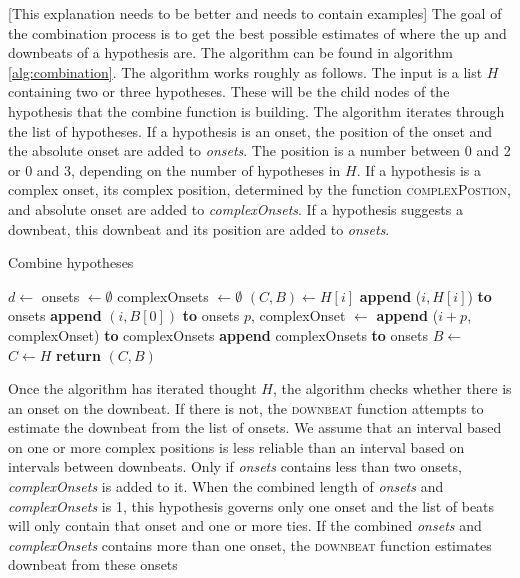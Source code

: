 [This explanation needs to be better and needs to contain examples]
The goal of the combination process is to get the best possible estimates of where the up and downbeats of a hypothesis are. The algorithm can be found in algorithm \ref{alg:combination}. The algorithm works roughly as follows. The input is a list $H$ containing two or three hypotheses. These will be the child nodes of the hypothesis that the combine function is building. The algorithm iterates through the list of hypotheses. If a hypothesis is an onset, the position of the onset and the absolute onset are added to \textit{onsets}. The position is a number between 0 and 2 or 0 and 3, depending on the number of hypotheses in $H$. If a hypothesis is a complex onset, its complex position, determined by the function \textsc{complexPostion}, and absolute onset are added to \textit{complexOnsets}. If a hypothesis suggests a downbeat, this downbeat and its position are added to \textit{onsets}.

\begin{algorithm}
\caption{Combine hypotheses}
\label{alg:combination}
\begin{algorithmic}
	\State $d \leftarrow$ 
	\State onsets $\leftarrow \emptyset$
	\State complexOnsets $\leftarrow \emptyset$
		\State $(C, B) \leftarrow H[i]$
			\State \textbf{append} ($i, H[i]$) \textbf{to} onsets
		\Else
				\State \textbf{append} $(i, B[0])$ \textbf{to} onsets
			\Else
				\State $p$, complexOnset $\leftarrow$ 
				\State \textbf{append} ($i + p$, complexOnset) \textbf{to} complexOnsets
			\EndIf
		\EndIf
	\EndFor
		\State \textbf{append} complexOnsets \textbf{to} onsets
	\EndIf
	\State $B \leftarrow$ 
	\State $C \leftarrow H$
	\State \textbf{return} $(C, B)$
\EndFunction
\end{algorithmic}
\end{algorithm}

Once the algorithm has iterated thought $H$, the algorithm checks whether there is an onset on the downbeat. If there is not, the \textsc{downbeat} function attempts to estimate the downbeat from the list of onsets. We assume that an interval based on one or more complex positions is less reliable than an interval based on intervals between downbeats. Only if \textit{onsets} contains less than two onsets, \textit{complexOnsets} is added to it. When the combined length of \textit{onsets} and \textit{complexOnsets} is 1, this hypothesis governs only one onset and the list of beats will only contain that onset and one or more ties. If the combined \textit{onsets} and \textit{complexOnsets} contains more than one onset, the \textsc{downbeat} function estimates downbeat from these onsets

